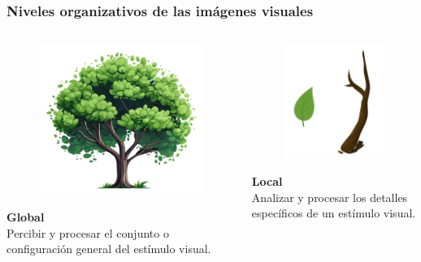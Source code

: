 \documentclass[
11pt, %
%
aspectratio=169, %
]{beamer}
\begin{document}
 	\begin{frame}
 		\frametitle{Niveles organizativos de las im\'agenes visuales} 		
 	
 	
 	\begin{columns}[c] %
 		\begin{column}{0.5\textwidth} %
 			\begin{figure}
 				\centering
 				\includegraphics[scale=0.3]{Graphics/tree}
 			\end{figure}
 			\centering
 			\textbf{Global}\\
 			Percibir y procesar el conjunto o configuraci\'on general del est\'imulo visual.
 			
 			
 		\end{column}
 		
 		
 		\begin{column}{0.5\textwidth} %
 			\begin{figure}
 				\centering
 				\includegraphics[scale=0.43]{Graphics/leaf_branch}
 			\end{figure}
 			\centering
 			\textbf{Local}\\
 			 Analizar y procesar los detalles específicos de un estímulo visual.		
 			

\end{column}
\end{columns}
\end{frame}
\end{document}
